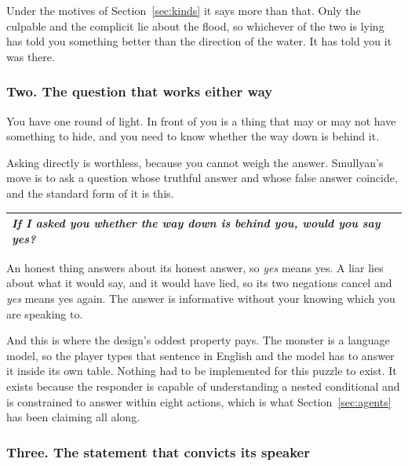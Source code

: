 \documentclass[11pt,a4paper]{article}
\begin{document}
\begin{sectionbox}
Under the motives of Section~\ref{sec:kinds} it says more than that. Only the culpable and the
complicit lie about the flood, so whichever of the two is lying has told you something better than
the direction of the water. It has told you it was there.
\end{sectionbox}

\subsubsection*{Two. The question that works either way}

You have one round of light. In front of you is a thing that may or may not have something to hide,
and you need to know whether the way down is behind it.

Asking directly is worthless, because you cannot weigh the answer. Smullyan's move is to ask a
question whose truthful answer and whose false answer coincide, and the standard form of it is
this.

\begin{center}
\begin{tabular}{@{}>{\raggedright\arraybackslash}p{}@{}}
\toprule
\emph{If I asked you whether the way down is behind you, would you say yes?} \\
\bottomrule
\end{tabular}
\end{center}

An honest thing answers about its honest answer, so \emph{yes} means yes. A liar lies about what it
would say, and it would have lied, so its two negations cancel and \emph{yes} means yes again. The
answer is informative without your knowing which you are speaking to.

\begin{alarmbox}
And this is where the design's oddest property pays. The monster is a language model, so the player
types that sentence in English and the model has to answer it inside its own table. Nothing had to
be implemented for this puzzle to exist. It exists because the responder is capable of
understanding a nested conditional and is constrained to answer within eight actions, which is what
Section~\ref{sec:agents} has been claiming all along.
\end{alarmbox}

\subsubsection*{Three. The statement that convicts its speaker}
\end{document}
